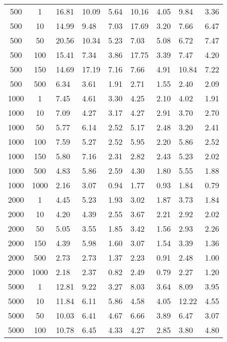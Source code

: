 \begin{table*}
\begin{center}
\begin{tabular}{cc|lllllll}
500   & 1    & 16.81  & 10.09  & 5.64   & 10.16  & 4.05  & 9.84   & 3.36  \\ 
500   & 10   & 14.99  & 9.48   & 7.03   & 17.69  & 3.20  & 7.66   & 6.47  \\ 
500   & 50   & 20.56  & 10.34  & 5.23   & 7.03   & 5.08  & 6.72   & 7.47  \\ 
500   & 100  & 15.41  & 7.34   & 3.86   & 17.75  & 3.39  & 7.47   & 4.20  \\ 
500   & 150  & 14.69  & 17.19  & 7.16   & 7.66   & 4.91  & 10.84  & 7.22  \\ 
500   & 500  & 6.34   & 3.61   & 1.91   & 2.71   & 1.55  & 2.40   & 2.09  \\ 
1000  & 1    & 7.45   & 4.61   & 3.30   & 4.25   & 2.10  & 4.02   & 1.91  \\ 
1000  & 10   & 7.09   & 4.27   & 3.17   & 4.27   & 2.91  & 3.70   & 2.70  \\ 
1000  & 50   & 5.77   & 6.14   & 2.52   & 5.17   & 2.48  & 3.20   & 2.41  \\ 
1000  & 100  & 7.59   & 5.27   & 2.52   & 5.95   & 2.20  & 5.86   & 2.52  \\ 
1000  & 150  & 5.80   & 7.16   & 2.31   & 2.82   & 2.43  & 5.23   & 2.02  \\ 
1000  & 500  & 4.83   & 5.86   & 2.59   & 4.30   & 1.80  & 5.55   & 1.88  \\ 
1000  & 1000 & 2.16   & 3.07   & 0.94   & 1.77   & 0.93  & 1.84   & 0.79  \\ 
2000  & 1    & 4.45   & 5.23   & 1.93   & 3.02   & 1.87  & 3.73   & 1.84  \\ 
2000  & 10   & 4.20   & 4.39   & 2.55   & 3.67   & 2.21  & 2.92   & 2.02  \\ 
2000  & 50   & 5.05   & 3.55   & 1.85   & 3.42   & 1.56  & 2.93   & 2.26  \\ 
2000  & 150  & 4.39   & 5.98   & 1.60   & 3.07   & 1.54  & 3.39   & 1.36  \\ 
2000  & 500  & 2.73   & 2.73   & 1.37   & 2.23   & 0.91  & 2.48   & 1.00  \\ 
2000  & 1000 & 2.18   & 2.37   & 0.82   & 2.49   & 0.79  & 2.27   & 1.20  \\ 
5000  & 1    & 12.81  & 9.22   & 3.27   & 8.03   & 3.64  & 8.09   & 3.95  \\ 
5000  & 10   & 11.84  & 6.11   & 5.86   & 4.58   & 4.05  & 12.22  & 4.55  \\ 
5000  & 50   & 10.03  & 6.41   & 4.67   & 6.66   & 3.89  & 6.47   & 3.07  \\ 
5000  & 100  & 10.78  & 6.45   & 4.33   & 4.27   & 2.85  & 3.80   & 4.80  \\ 

\end{tabular}
\end{center}
\end{table*}
